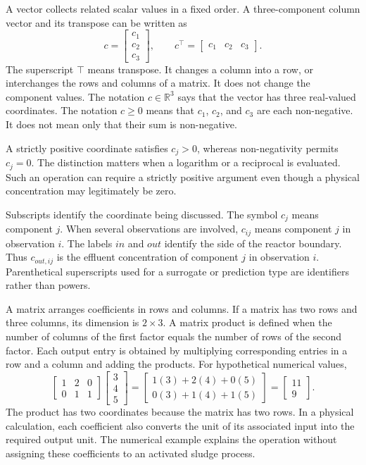 A vector collects related scalar values in a fixed order. A three-component column vector and its transpose can be written as
\[
c=\begin{bmatrix}c_1\\c_2\\c_3\end{bmatrix},\qquad
c^\top=\begin{bmatrix}c_1&c_2&c_3\end{bmatrix}.
\]
The superscript $\top$ means transpose. It changes a column into a row, or interchanges the rows and columns of a matrix. It does not change the component values. The notation $c\in\mathbb{R}^3$ says that the vector has three real-valued coordinates. The notation $c\geq0$ means that $c_1$, $c_2$, and $c_3$ are each non-negative. It does not mean only that their sum is non-negative.

A strictly positive coordinate satisfies $c_j>0$, whereas non-negativity permits $c_j=0$. The distinction matters when a logarithm or a reciprocal is evaluated. Such an operation can require a strictly positive argument even though a physical concentration may legitimately be zero.

Subscripts identify the coordinate being discussed. The symbol $c_j$ means component $j$. When several observations are involved, $c_{ij}$ means component $j$ in observation $i$. The labels $in$ and $out$ identify the side of the reactor boundary. Thus $c_{out,ij}$ is the effluent concentration of component $j$ in observation $i$. Parenthetical superscripts used for a surrogate or prediction type are identifiers rather than powers.

A matrix arranges coefficients in rows and columns. If a matrix has two rows and three columns, its dimension is $2\times3$. A matrix product is defined when the number of columns of the first factor equals the number of rows of the second factor. Each output entry is obtained by multiplying corresponding entries in a row and a column and adding the products. For hypothetical numerical values,
\[
\begin{bmatrix}1&2&0\\0&1&1\end{bmatrix}
\begin{bmatrix}3\\4\\5\end{bmatrix}
=\begin{bmatrix}1(3)+2(4)+0(5)\\0(3)+1(4)+1(5)\end{bmatrix}
=\begin{bmatrix}11\\9\end{bmatrix}.
\]
The product has two coordinates because the matrix has two rows. In a physical calculation, each coefficient also converts the unit of its associated input into the required output unit. The numerical example explains the operation without assigning these coefficients to an activated sludge process.

